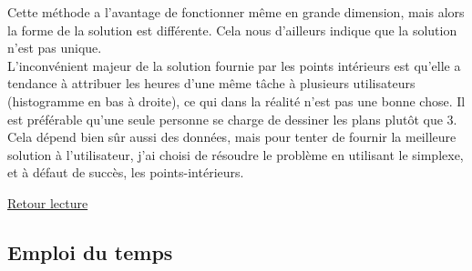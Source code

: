 \documentclass[12pt]{article}
\begin{document}
Cette méthode a l'avantage de fonctionner même en grande dimension, mais alors la forme de la solution est différente. Cela nous d'ailleurs indique que la solution n'est pas unique.\\
L'inconvénient majeur de la solution fournie par les points intérieurs est qu'elle a tendance à attribuer les heures d'une même tâche à plusieurs utilisateurs (histogramme en bas à droite), ce qui dans la réalité n'est pas une bonne chose. Il est préférable qu'une seule personne se charge de dessiner les plans plutôt que 3.\\
Cela dépend bien sûr aussi des données, mais pour tenter de fournir la meilleure solution à l'utilisateur, j'ai choisi de résoudre le problème en utilisant le simplexe, et à défaut de succès, les points-intérieurs.

\hyperlink{ref12}{Retour lecture}

\newpage
\subsection{Emploi du temps}
\hypertarget{ref13}{}
\end{document}

